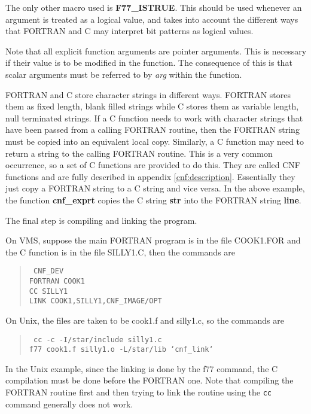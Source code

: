 The only other macro used is {\bf F77\_\-ISTRUE}. This should be used whenever
an argument is treated as a logical value, and takes into account the different
ways that FORTRAN and C may interpret bit patterns as logical values.

Note that all explicit function arguments are pointer arguments. This is
necessary if their value is to be modified in the function. The consequence of
this is that scalar arguments must be referred to by {\tt*}{\em arg} within
the function.

FORTRAN and C store character strings in different ways. FORTRAN stores them as
fixed length, blank filled strings while C stores them as variable length, null
terminated strings. If a C function needs to work with character strings that
have been passed from a calling FORTRAN routine, then the FORTRAN string must
be copied into an equivalent local copy. Similarly, a C function may need to
return a string to the calling FORTRAN routine. This is a very common
occurrence, so a set of C functions are provided to do this. They are called CNF
functions and are fully described in appendix \ref{cnf:description}.
Essentially they just copy a FORTRAN string to a C string and vice versa. In
the above example, the function {\bf cnf\_exprt} copies the C string {\bf str}
into the FORTRAN string {\bf line}.

The final step is compiling and linking the program.

On VMS, suppose the main FORTRAN program is in the file COOK1.FOR and the C
function is in the file SILLY1.C, then the commands are
\begin{quote}{\tt
CNF\_DEV\\
FORTRAN COOK1\\
CC SILLY1\\
LINK COOK1,SILLY1,CNF\_IMAGE/OPT
}
\end{quote}

On Unix, the files are taken to be cook1.f and silly1.c, so the commands are
\begin{quote}{\tt
cc -c -I/star/include silly1.c\\
f77 cook1.f silly1.o -L/star/lib `cnf\_link`
}
\end{quote}

In the Unix example, since the linking is done by the f77 command, the
C compilation must be done before the FORTRAN one. Note that compiling the
FORTRAN routine first and then trying to link the routine using the {\tt cc}
command generally does not work.

